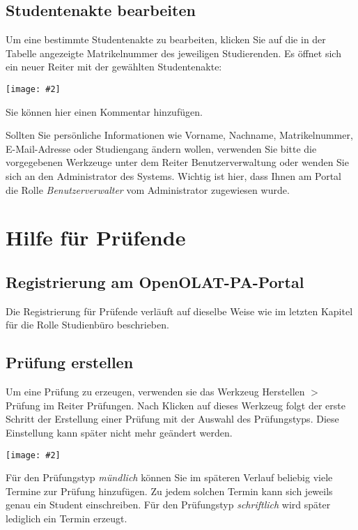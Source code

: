 \documentclass[a4paper,11pt]{article}
\newcommand{\bild}[2]{
    \begin{center}\texttt{[image: \#2]}\end{center}
}
\newcommand{\knopf}[1]{{\sc #1}}
\begin{document}
\subsection{Studentenakte bearbeiten}

Um eine bestimmte Studentenakte zu bearbeiten, klicken Sie auf
die in der Tabelle angezeigte Matrikelnummer des jeweiligen Studierenden.
Es öffnet sich ein neuer Reiter mit der gewählten Studentenakte:

\bild{1}{ESA-Edit}

Sie können hier einen \knopf{Kommentar hinzufügen}.

Sollten Sie persönliche Informationen wie Vorname, Nachname,
Matrikelnummer, E-Mail-Adresse oder Studiengang ändern wollen, verwenden Sie
bitte die vorgegebenen Werkzeuge unter dem Reiter \knopf{Benutzerverwaltung}
oder wenden Sie sich an den Administrator des Systems. Wichtig ist hier, dass
Ihnen am Portal die Rolle {\em Benutzerverwalter} vom Administrator zugewiesen wurde.

\clearpage
\section{Hilfe für Prüfende}

\subsection{Registrierung am OpenOLAT-PA-Portal}

Die Registrierung für Prüfende verläuft auf dieselbe Weise wie im letzten
Kapitel für die Rolle Studienbüro beschrieben.

\subsection{Prüfung erstellen}

Um eine Prüfung zu erzeugen, verwenden sie das Werkzeug \knopf{Herstellen $>$
Prüfung} im Reiter \knopf{Prüfungen}. Nach Klicken auf dieses Werkzeug
folgt der erste Schritt der Erstellung einer Prüfung mit der Auswahl des
Prüfungstyps. Diese Einstellung kann später nicht mehr geändert werden.

\bild{1}{Pruefung-Erzeugen-Typ}

Für den Prüfungstyp {\em mündlich} können Sie im späteren Verlauf beliebig
viele Termine zur Prüfung hinzufügen. Zu jedem solchen Termin kann sich
jeweils genau ein Student einschreiben. Für den Prüfungstyp {\em schriftlich}
wird später lediglich ein Termin erzeugt.
\end{document}

